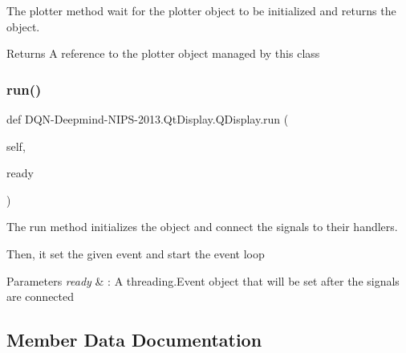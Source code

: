 The plotter method wait for the plotter object to be initialized and returns the object. 

\begin{DoxyReturn}{Returns}
A reference to the plotter object managed by this class 
\end{DoxyReturn}
\hypertarget{classDQN-Deepmind-NIPS-2013_1_1QtDisplay_1_1QDisplay_ae9c369b6776a7ca0805044f597be7cb2}{}\label{classDQN-Deepmind-NIPS-2013_1_1QtDisplay_1_1QDisplay_ae9c369b6776a7ca0805044f597be7cb2} 
\subsubsection{\texorpdfstring{run()}{run()}}
{\footnotesize\ttfamily def D\+QN-\/Deepmind-\/N\+I\+PS-\/2013.Qt\+Display.\+Q\+Display.\+run (\begin{DoxyParamCaption}\item[{}]{self,  }\item[{}]{ready }\end{DoxyParamCaption})}



The run method initializes the object and connect the signals to their handlers. 

Then, it set the given event and start the event loop


\begin{DoxyParams}{Parameters}
{\em ready} & \+: A threading.\+Event object that will be set after the signals are connected \\
\hline
\end{DoxyParams}


\subsection{Member Data Documentation}
\hypertarget{classDQN-Deepmind-NIPS-2013_1_1QtDisplay_1_1QDisplay_adf7d2844b0fc2026a3d4c2ed3d1218b9}{}\label{classDQN-Deepmind-NIPS-2013_1_1QtDisplay_1_1QDisplay_adf7d2844b0fc2026a3d4c2ed3d1218b9} 
